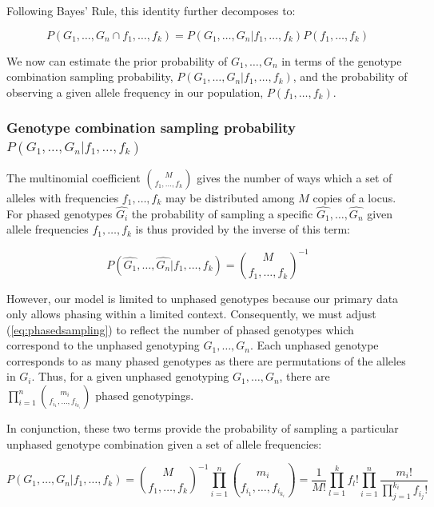 \documentclass{article}
\begin{document}
Following Bayes' Rule, this identity further decomposes to:

\begin{equation}
P(G_1,\ldots,G_n \cap f_1,\ldots,f_k) = P(G_1,\ldots,G_n | f_1,\ldots,f_k) P(f_1,\ldots,f_k)
\end{equation}

We now can estimate the prior probability of $G_1,\ldots,G_n$ in terms of the genotype combination sampling probability, $P(G_1,\ldots,G_n | f_1,\ldots,f_k)$, and the probability of observing a given allele frequency in our population, $P(f_1,\ldots,f_k)$.

\subsubsection{Genotype combination sampling probability $P(G_1,\ldots,G_n | f_1,\ldots,f_k)$}

The multinomial coefficient ${M \choose f_1,\ldots,f_k }$ gives the number of ways which a set of alleles with frequencies $f_1,\ldots,f_k$ may be distributed among $M$ copies of a locus.  For phased genotypes $\hat{G_i}$ the probability of sampling a specific $\hat{G_1},\ldots,\hat{G_n}$ given allele frequencies $f_1,\ldots,f_k$ is thus provided by the inverse of this term:

\begin{equation}
\label{eq:phasedsampling}
P(\hat{G_1},\ldots,\hat{G_n} | f_1,\ldots,f_k) =
{M \choose
  f_1,\ldots,f_k }^{-1}
\end{equation}

However, our model is limited to unphased genotypes because our primary data only allows phasing within a limited context. Consequently, we must adjust (\ref{eq:phasedsampling}) to reflect the number of phased genotypes which correspond to the unphased genotyping $G_1,\ldots,G_n$.  Each unphased genotype corresponds to as many phased genotypes as there are permutations of the alleles in $G_i$.  Thus, for a given unphased genotyping $G_1,\ldots,G_n$, there are $\prod_{i=1}^n { m_i \choose f_{i_1}, \ldots, f_{i_{k_i}}}$ phased genotypings.

In conjunction, these two terms provide the probability of sampling a particular unphased genotype combination given a set of allele frequencies:

\begin{equation}
\label{eq:unphasedsampling}
P(G_1,\ldots,G_n | f_1,\ldots,f_k) =
{ M \choose f_1,\ldots,f_k }^{-1}
\prod_{i=1}^n { m_i \choose f_{i_1}, \ldots, f_{i_{k_i}}}
 = 
\frac{1}{M!}
\prod_{l=1}^k f_l! 
\prod_{i=1}^n \frac{m_i!}{\prod_{j=1}^{k_i} f_{i_j}!}
\end{equation}
\end{document}
